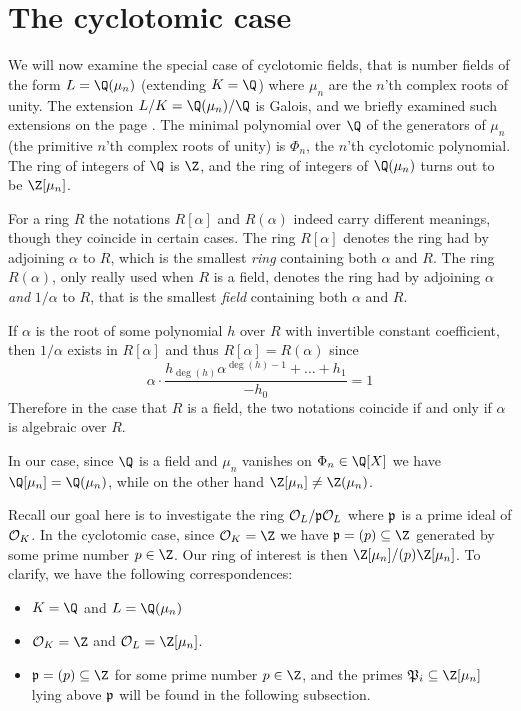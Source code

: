 \section{The cyclotomic case}

We will now examine the special case of cyclotomic fields, that is number fields of the form $L=\Q(\mu_n)$ (extending $K=\Q$) where $\mu_n$ are the $n$'th complex roots of unity.
The extension $L/K=\Q(\mu_n)/\Q$ is Galois, and we briefly examined such extensions on the page .
The minimal polynomial over $\Q$ of the generators of $\mu_n$ (the primitive $n$'th complex roots of unity) is $\Phi_n$, the $n$'th cyclotomic polynomial.
The ring of integers of $\Q$ is $\Z$, and the ring of integers of $\Q(\mu_n)$ turns out to be $\Z[\mu_n]$.

\begin{remark}
    For a ring $R$ the notations $R[\alpha]$ and $R(\alpha)$ indeed carry different meanings, though they coincide in certain cases.
    The ring $R[\alpha]$ denotes the ring had by adjoining $\alpha$ to $R$, which is the smallest \emph{ring} containing both $\alpha$ and $R$.
    The ring $R(\alpha)$, only really used when $R$ is a field, denotes the ring had by adjoining $\alpha$ \emph{and} $1/\alpha$ to $R$, that is the smallest \emph{field} containing both $\alpha$ and $R$.

    If $\alpha$ is the root of some polynomial $h$ over $R$ with invertible constant coefficient, then $1/\alpha$ exists in $R[\alpha]$ and thus $R[\alpha]=R(\alpha)$ since
    \begin{equation}
        \alpha\cdot\frac{h_{\deg(h)}\alpha^{\deg(h)-1}+\dots+h_1}{-h_0}=1
    \end{equation}
    Therefore in the case that $R$ is a field, the two notations coincide if and only if $\alpha$ is algebraic over $R$.
\end{remark}
In our case, since $\Q$ is a field and $\mu_n$ vanishes on $\Phi_n\in\Q[X]$ we have $\Q[\mu_n]=\Q(\mu_n)$, while on the other hand $\Z[\mu_n]\neq\Z(\mu_n)$.

Recall our goal here is to investigate the ring $\mathcal{O}_L/\mathfrak{p}\mathcal{O}_L$ where $\mathfrak{p}$ is a prime ideal of $\mathcal{O}_K$.
In the cyclotomic case, since $\O_K=\Z$ we have $\i{p}=(p)\subseteq\Z$ generated by some prime number $p\in\Z$.
Our ring of interest is then $\Z[\mu_n]/(p)\Z[\mu_n]$.
To clarify, we have the following correspondences:
\begin{itemize}
    \item
     $K=\Q$ and $L=\Q(\mu_n)$
    \item
     $\O_K=\Z$ and $\O_L=\Z[\mu_n]$.
    \item
     $\i{p}=(p)\subseteq\Z$ for some prime number $p\in\Z$, and the primes $\i{P}_i\subseteq\Z[\mu_n]$ lying above $\mathfrak{p}$ will be found in the following subsection.
\end{itemize}


